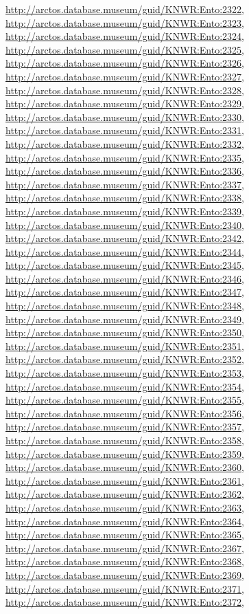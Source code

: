 \documentclass[9pt, article]{memoir}
\begin{document}
\begin{multicols}{2}
\url{http://arctos.database.museum/guid/KNWR:Ento:2322}, 
\url{http://arctos.database.museum/guid/KNWR:Ento:2323}, 
\url{http://arctos.database.museum/guid/KNWR:Ento:2324}, 
\url{http://arctos.database.museum/guid/KNWR:Ento:2325}, 
\url{http://arctos.database.museum/guid/KNWR:Ento:2326}, 
\url{http://arctos.database.museum/guid/KNWR:Ento:2327}, 
\url{http://arctos.database.museum/guid/KNWR:Ento:2328}, 
\url{http://arctos.database.museum/guid/KNWR:Ento:2329}, 
\url{http://arctos.database.museum/guid/KNWR:Ento:2330}, 
\url{http://arctos.database.museum/guid/KNWR:Ento:2331}, 
\url{http://arctos.database.museum/guid/KNWR:Ento:2332}, 
\url{http://arctos.database.museum/guid/KNWR:Ento:2335}, 
\url{http://arctos.database.museum/guid/KNWR:Ento:2336}, 
\url{http://arctos.database.museum/guid/KNWR:Ento:2337}, 
\url{http://arctos.database.museum/guid/KNWR:Ento:2338}, 
\url{http://arctos.database.museum/guid/KNWR:Ento:2339}, 
\url{http://arctos.database.museum/guid/KNWR:Ento:2340}, 
\url{http://arctos.database.museum/guid/KNWR:Ento:2342}, 
\url{http://arctos.database.museum/guid/KNWR:Ento:2344}, 
\url{http://arctos.database.museum/guid/KNWR:Ento:2345}, 
\url{http://arctos.database.museum/guid/KNWR:Ento:2346}, 
\url{http://arctos.database.museum/guid/KNWR:Ento:2347}, 
\url{http://arctos.database.museum/guid/KNWR:Ento:2348}, 
\url{http://arctos.database.museum/guid/KNWR:Ento:2349}, 
\url{http://arctos.database.museum/guid/KNWR:Ento:2350}, 
\url{http://arctos.database.museum/guid/KNWR:Ento:2351}, 
\url{http://arctos.database.museum/guid/KNWR:Ento:2352}, 
\url{http://arctos.database.museum/guid/KNWR:Ento:2353}, 
\url{http://arctos.database.museum/guid/KNWR:Ento:2354}, 
\url{http://arctos.database.museum/guid/KNWR:Ento:2355}, 
\url{http://arctos.database.museum/guid/KNWR:Ento:2356}, 
\url{http://arctos.database.museum/guid/KNWR:Ento:2357}, 
\url{http://arctos.database.museum/guid/KNWR:Ento:2358}, 
\url{http://arctos.database.museum/guid/KNWR:Ento:2359}, 
\url{http://arctos.database.museum/guid/KNWR:Ento:2360}, 
\url{http://arctos.database.museum/guid/KNWR:Ento:2361}, 
\url{http://arctos.database.museum/guid/KNWR:Ento:2362}, 
\url{http://arctos.database.museum/guid/KNWR:Ento:2363}, 
\url{http://arctos.database.museum/guid/KNWR:Ento:2364}, 
\url{http://arctos.database.museum/guid/KNWR:Ento:2365}, 
\url{http://arctos.database.museum/guid/KNWR:Ento:2367}, 
\url{http://arctos.database.museum/guid/KNWR:Ento:2368}, 
\url{http://arctos.database.museum/guid/KNWR:Ento:2369}, 
\url{http://arctos.database.museum/guid/KNWR:Ento:2371}, 
\url{http://arctos.database.museum/guid/KNWR:Ento:2372}, 

\end{multicols}
\end{document}

